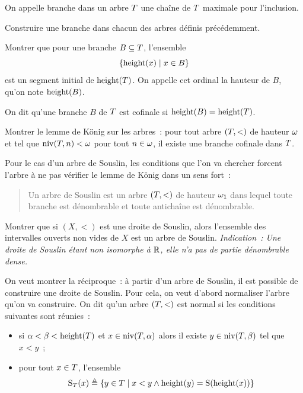 \begin{problem}
  On appelle branche dans un arbre $T$ une chaîne de $T$ maximale
  pour l'inclusion.
  \begin{pbQuest}[resume]
  \item Construire une branche dans chacun des arbres définis précédemment.
  \item Montrer que pour une branche $B \subseteq T$, l'ensemble
    \[\left\{ \operatorname{height}(x) \;\middle\vert\; x \in B \right\}\]
    est un segment initial de $\operatorname{height}(T)$. On appelle cet ordinal la
    hauteur de $B$, qu'on note $\operatorname{height}(B)$.
  \end{pbQuest}
  On dit qu'une branche $B$ de $T$ est cofinale si
  $\operatorname{height}(B) = \operatorname{height}(T)$.
  \begin{pbQuest}[resume]
  \item Montrer le lemme de König sur les arbres~: pour tout arbre
    $(T,<)$ de hauteur $\omega$ et tel que $\operatorname{niv}(T,n) < \omega$ pour
    tout $n \in \omega$, il existe une branche cofinale dans $T$.
  \end{pbQuest}
  Pour le cas d'un arbre de Souslin, les conditions que l'on va chercher forcent
  l'arbre à ne pas vérifier le lemme de König dans un sens fort~:
  \begin{quotation}
    \noindent
    Un arbre de Souslin est un arbre $(T,<)$ de hauteur $\omega_1$ dans
    lequel toute branche est dénombrable et toute antichaîne est dénombrable.
  \end{quotation}
  \begin{pbQuest}[resume]
  \item Montrer que si $(X,<)$ est une droite de Souslin, alors l'ensemble des
    intervalles ouverts non vides de $X$ est un arbre de Souslin.
    \textit{Indication~: Une droite de Souslin étant non isomorphe à $\mathbb R$, elle
      n'a pas de partie dénombrable dense.}
  \end{pbQuest}
  On veut montrer la réciproque~: à partir d'un arbre de Souslin, il est
  possible de construire une droite de Souslin. Pour cela, on veut d'abord
  normaliser l'arbre qu'on va construire. On dit qu'un arbre $(T,<)$ est
  normal si les conditions suivantes sont réunies~:
  \begin{itemize}
  \item si $\alpha < \beta < \operatorname{height}(T)$ et
    $x \in \operatorname{niv}(T,\alpha)$ alors il existe
    $y \in \operatorname{niv}(T,\beta)$ tel que $x < y$~;
  \item pour tout $x \in T$, l'ensemble
    \[\operatorname{S}_{T}(x) \triangleq
    \left\{ y \in T \;\middle\vert\; x < y \land \operatorname{height}(y) = \operatorname{S}(\operatorname{height}(x)) \right\}\]

\end{itemize}
\end{problem}
